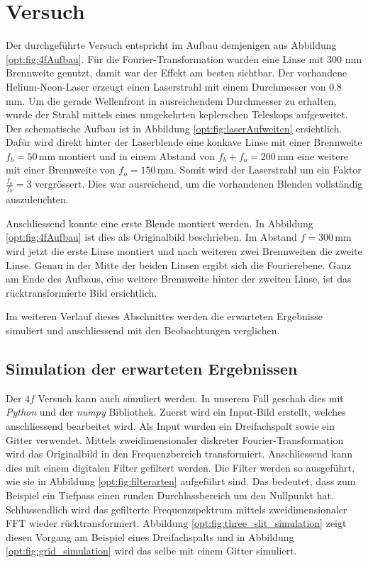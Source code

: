 %
%
%
%
\section{Versuch
  \label{opt:section:versuch}}

Der durchgeführte Versuch entspricht im Aufbau demjenigen aus Abbildung \ref{opt:fig:4fAufbau}.
Für die Fourier-Transformation wurden eine Linse mit 300 mm Brennweite genutzt, damit war der Effekt am besten sichtbar.
Der vorhandene Helium-Neon-Laser erzeugt einen Laserstrahl mit einem Durchmesser von $0.8$ mm.
Um die gerade Wellenfront in ausreichendem Durchmesser zu erhalten, wurde der Strahl mittels eines umgekehrten keplerschen Teleskops aufgeweitet.
Der schematische Aufbau ist in Abbildung \ref{opt:fig:laserAufweiten} ersichtlich.
Dafür wird direkt hinter der Laserblende eine konkave Linse mit einer Brennweite $f_b = 50\,\text{mm}$ montiert 
und in einem Abstand von $f_b + f_o = 200\,\text{mm}$ eine weitere mit einer Brennweite von $f_o = 150\,\text{mm}$.
Somit wird der Laserstrahl um ein Faktor $\frac{f_o}{f_b} = 3$ vergrössert.
Dies war ausreichend, um die vorhandenen Blenden vollständig auszuleuchten.

Anschliessend konnte eine erste Blende montiert werden.
In Abbildung \ref{opt:fig:4fAufbau} ist dies als Originalbild beschrieben.
Im Abstand $f=300\,\text{mm}$ wird jetzt die erste Linse montiert und nach weiteren zwei Brennweiten die zweite Linse.
Genau in der Mitte der beiden Linsen ergibt sich die Fourierebene.
Ganz am Ende des Aufbaus, eine weitere Brennweite hinter der zweiten Linse, ist das rücktransformierte Bild ersichtlich.

Im weiteren Verlauf dieses Abschnittes werden die erwarteten Ergebnisse simuliert und anschliessend mit den Beobachtungen verglichen.

\subsection{Simulation der erwarteten Ergebnissen}
Der $4f$ Versuch kann auch simuliert werden.
In unserem Fall geschah dies mit \emph{Python} und der \emph{numpy} Bibliothek.
Zuerst wird ein Input-Bild erstellt, welches anschliessend bearbeitet wird.
Als Input wurden ein Dreifachspalt sowie ein Gitter verwendet.
Mittels zweidimensionaler diskreter Fourier-Transformation wird das Originalbild in den Frequenzbereich transformiert.
Anschliessend kann dies mit einem digitalen Filter gefiltert werden.
Die Filter werden so ausgeführt, wie sie in Abbildung \ref{opt:fig:filterarten} aufgeführt sind.
Das bedeutet, dass zum Beispiel ein Tiefpass einen runden Durchlassbereich um den Nullpunkt hat.
Schlussendlich wird das gefilterte Frequenzspektrum mittels zweidimensionaler FFT wieder rücktransformiert.
Abbildung \ref{opt:fig:three_slit_simulation} zeigt diesen Vorgang am Beispiel eines Dreifachspalts und 
in Abbildung \ref{opt:fig:grid_simulation} wird das selbe mit einem Gitter simuliert.

